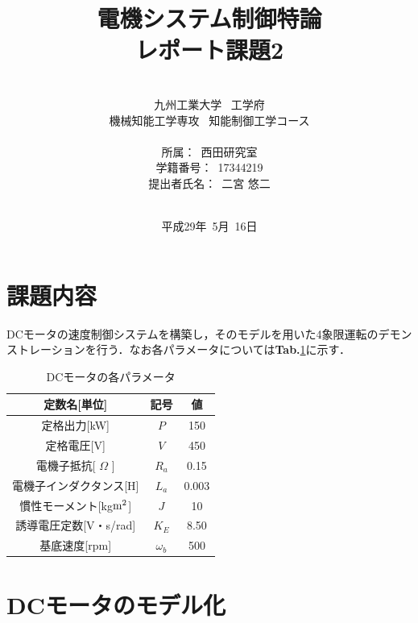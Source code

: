 \documentclass[a4paper,12pt]{jarticle}
\title{\Large{電機システム制御特論\\ レポート課題2}
}
\author{\vspace{70mm}\\
九州工業大学\ \hspace{0mm} 工学府\\
機械知能工学専攻\ \hspace{0mm} 知能制御工学コース\\
\\
所属：\ 西田研究室\\
学籍番号：\ 17344219\\
提出者氏名：\ 二宮 \hspace{0mm} 悠二\\\vspace{5mm}\\}
\date{平成29年\ 5月\ 16日}
\begin{document}
\titlepage
\maketitle
\thispagestyle{empty}
\newpage

\thispagestyle{empty}
\tableofcontents
\newpage

 \section{課題内容}
DCモータの速度制御システムを構築し，そのモデルを用いた4象限運転のデモンストレーションを行う．なお各パラメータについては{\bf Tab.}\ref{parametas}に示す．

\begin{table}[htb]
  \begin{center}
    \caption{DCモータの各パラメータ}
    \begin{tabular}{c|c|c} \hline
      定数名[単位] & 記号 & 値 \\ \hline \hline
      定格出力[kW] & $ P $ & 150 \\ \hline
      定格電圧[V] & $ V $ & 450 \\ \hline
      電機子抵抗[ $ \Omega $ ] & $ R_a $ & 0.15 \\ \hline
      電機子インダクタンス[H] & $ L_a $ & 0.003 \\ \hline
      慣性モーメント[kg$ {\rm m}^2 $] & $ J $ & 10 \\ \hline
      誘導電圧定数[V・s/rad] & $ K_E $ & 8.50 \\ \hline
      基底速度[rpm] & $ \omega_b $ & 500 \\ \hline
    \end{tabular}
    \label{parametas}
  \end{center}
\end{table}


\section{DCモータのモデル化}
\end{document}
